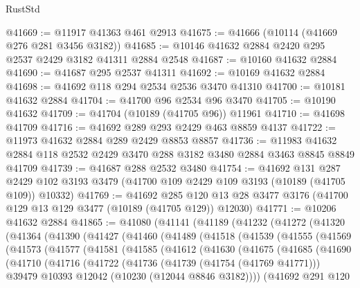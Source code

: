 \begin{lexlean}{RustStd}
\begin{coremodule}
@41669 := @11917 @41363 @461 @2913
@41675 := @41666 (@10114 (@41669 @276 @281 @3456 @3182))
@41685 := @10146 @41632 @2884 @2420 @295 @2537 @2429 @3182 @41311 @2884 @2548
@41687 := @10160 @41632 @2884
@41690 := @41687 @295 @2537 @41311
@41692 := @10169 @41632 @2884
@41698 := @41692 @118 @294 @2534 @2536 @3470 @41310
@41700 := @10181 @41632 @2884
@41704 := @41700 @96 @2534 @96 @3470
@41705 := @10190 @41632
@41709 := @41704 (@10189 (@41705 @96)) @11961
@41710 := @41698 @41709
@41716 := @41692 @289 @293 @2429 @463 @8859 @4137
@41722 := @11973 @41632 @2884 @289 @2429 @8853 @8857
@41736 := @11983 @41632 @2884 @118 @2532 @2429 @3470 @288 @3182 @3480 @2884 @3463 @8845 @8849 @41709
@41739 := @41687 @288 @2532 @3480
@41754 := @41692
    @131
    @287
    @2429
    @102
    @3193
    @3479
    (@41700 @109 @2429 @109 @3193 (@10189 (@41705 @109)) @10332)
@41769 := @41692
    @285
    @120
    @13
    @28
    @3477
    @3176
    (@41700 @129 @13 @129 @3477 (@10189 (@41705 @129)) @12030)
@41771 := @10206 @41632 @2884
@41865 := @41080
    (@41141
      (@41189
        (@41232
          (@41272
            (@41320
              (@41364
                (@41390
                  (@41427
                    (@41460
                      (@41489
                        (@41518
                          (@41539
                            (@41555
                              (@41569
                                (@41573
                                  (@41577
                                    (@41581
                                      (@41585
                                        (@41612
                                          (@41630
                                            (@41675
                                              (@41685
                                                (@41690
                                                  (@41710
                                                    (@41716
                                                      (@41722
                                                        (@41736
                                                          (@41739 (@41754 (@41769 @41771)))
                                                          @39479
                                                          @10393
                                                          @12042
                                                          (@10230 (@12044 @8846 @3182))))
                                                      (@41692
                                                        @291
                                                        @120

\end{coremodule}
\end{lexlean}
